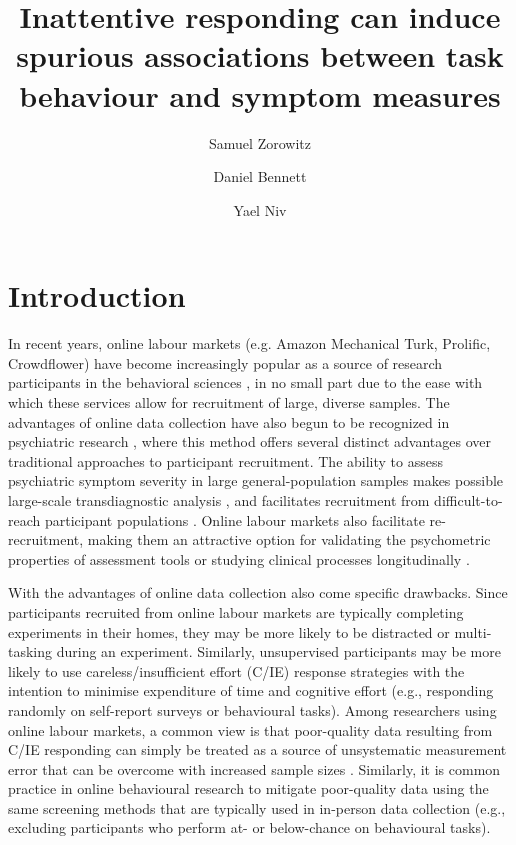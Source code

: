 \documentclass[a4paper,notitlepage,12pt]{article}
\author[1]{Samuel Zorowitz}
\author[1,2]{Daniel Bennett}
\author[1,3]{Yael Niv}
\affil[1]{Princeton Neuroscience Institute, Princeton University, USA}
\affil[2]{Department of Psychiatry, Monash University, Australia}
\affil[3]{Department of Psychology, Princeton University, USA}
\title{Inattentive responding can induce spurious associations between task behaviour and symptom measures}
\date{}
\begin{document}
\maketitle


\clearpage

\setlength{\parindent}{0em}
\setlength{\parskip}{1em}

\section{Introduction}

In recent years, online labour markets (e.g. Amazon Mechanical Turk, Prolific, Crowdflower) have become increasingly popular as a source of research participants in the behavioral sciences \cite{stewart2017crowdsourcing}, in no small part due to the ease with which these services allow for recruitment of large, diverse samples. The advantages of online data collection have also begun to be recognized in psychiatric research \cite{chandler2016conducting}, where this method offers several distinct advantages over traditional approaches to participant recruitment. The ability to assess psychiatric symptom severity in large general-population samples makes possible large-scale transdiagnostic analysis \cite{gillan2016taking, rutledge2019machine}, and facilitates recruitment from difficult-to-reach participant populations \cite{strickland2019use}. Online labour markets also facilitate re-recruitment, making them an attractive option for validating the psychometric properties of assessment tools \cite{enkavi2019large} or studying clinical processes longitudinally \cite{kothe2019retention}.

With the advantages of online data collection also come specific drawbacks. Since participants recruited from online labour markets are typically completing experiments in their homes, they may be more likely to be distracted or multi-tasking during an experiment. Similarly, unsupervised participants may be more likely to use careless/insufficient effort (C/IE) response strategies with the intention to minimise expenditure of time and cognitive effort (e.g., responding randomly on self-report surveys or behavioural tasks). Among researchers using online labour markets, a common view is that poor-quality data resulting from C/IE responding can simply be treated as a source of unsystematic measurement error that can be overcome with increased sample sizes \cite{gillan2016taking, chandler2020participant}. Similarly, it is common practice in online behavioural research to mitigate poor-quality data using the same screening methods that are typically used in in-person data collection (e.g., excluding participants who perform at- or below-chance on behavioural tasks).
\end{document}
